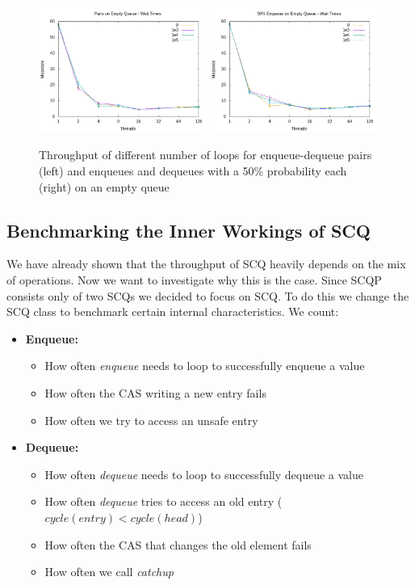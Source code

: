 \documentclass{article}      %
\begin{document}
\begin{figure}[H]
	\centering
	\includegraphics[width=0.49\textwidth]{Pictures/wait_pairs.png}
	\includegraphics[width=0.49\textwidth]{Pictures/wait_enqdeq50.png}
	\caption{Throughput of different number of loops for enqueue-dequeue pairs (left) and enqueues and dequeues with a 50\% probability each (right) on an empty queue}
	\label{fig:wait}
\end{figure}


\subsection{Benchmarking  the Inner Workings of SCQ}
\label{sec:diss}
We have already shown that the throughput of SCQ heavily depends on the mix of operations. Now we want to investigate why this is the case. Since SCQP consists only of two SCQs we decided to focus on SCQ. To do this we change the SCQ class to benchmark certain internal characteristics. We count:
\begin{samepage}
\begin{itemize}
	\item \textbf{Enqueue:} 
	\begin{itemize}
		\item How often \textit{enqueue} needs to loop to successfully enqueue a value
		\item How often the CAS writing a new entry fails
		\item How often we try to access an unsafe entry
	\end{itemize}
	\item \textbf{Dequeue:}
	\begin{itemize}
		\item How often \textit{dequeue} needs to loop to successfully dequeue a value 
		\item How often \textit{dequeue} tries to access an old entry ($cycle(entry)<cycle(head)$)
		\item How often the CAS that changes the old element fails
		\item How often we call \textit{catchup}
	\end{itemize}
\end{itemize}
\end{samepage}
	
\end{document}

